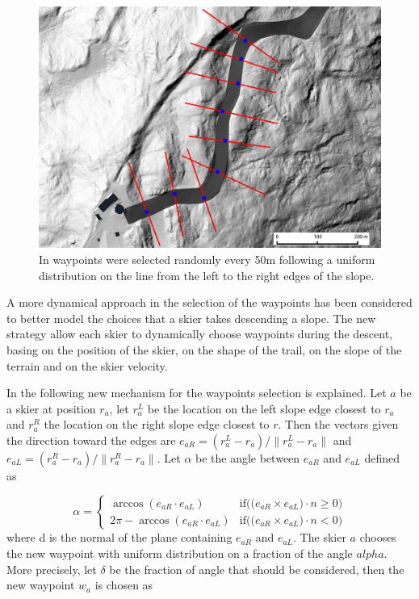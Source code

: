 \documentclass[12pt,a4paper,twoside]{book}
\newcommand{\norm}[1]{\lVert#1\rVert}
\begin{document}
\begin{figure}[!ht]
  \begin{center}
    \includegraphics[width=\textwidth]{images/waypoint_line.eps}
    \caption{In \cite{hol2012} waypoints were selected randomly every 50m following a uniform distribution on the line from the left to the right edges of the slope.}\label{waypoints_old_pic}
  \end{center}
\end{figure}

A more dynamical approach in the selection of the waypoints has been considered to better model the choices that a skier takes descending a slope. The new strategy allow each skier to dynamically choose waypoints during the descent, basing on the position of the skier, on the shape of the trail, on the slope of the terrain and on the skier velocity.

In the following new mechanism for the waypoints selection is explained. Let $a$ be a skier at position $r_a$, let $r_a^L$ be the location on the left slope edge closest to $r_a$ and $r_a^R$ the location on the right slope edge closest to $r$. Then the vectors given the direction toward the edges are $e_{aR}=\left(r_a^L-r_a\right)/\norm{r_a^L-r_a}$ and $e_{aL}=\left(r_a^R-r_a\right)/\norm{r_a^R-r_a}$. Let $\alpha$ be the angle between $e_{aR}$ and $e_{aL}$ defined as

\begin{equation}
\alpha=\begin{cases}
  \arccos(e_{aR} \cdot e_{aL}) & \text{if(($e_{aR} \times e_{aL})\cdot n \ge 0$)} \\
  2\pi-\arccos(e_{aR} \cdot e_{aL}) & \text{if(($e_{aR} \times e_{aL})\cdot n < 0$)}
\end{cases}
\end{equation}
where d is the normal of the plane containing $e_{aR}$ and $e_{aL}$. The skier $a$ chooses the new waypoint with uniform distribution on a fraction of the angle $alpha$. More precisely, let $\delta$ be the fraction of angle that should be considered, then the new waypoint $w_a$ is chosen as
\end{document}
